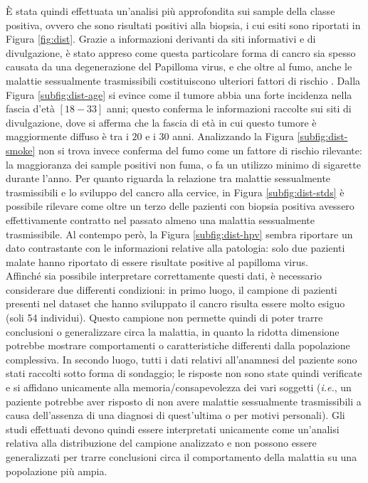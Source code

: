 È stata quindi effettuata un'analisi più approfondita sui sample della classe positiva, ovvero che sono risultati positivi alla biopsia, i cui esiti sono riportati in Figura \ref{fig:dist}.
Grazie a informazioni derivanti da siti informativi e di divulgazione, è stato appreso come questa particolare forma di cancro sia spesso causata da una degenerazione del Papilloma virus, e che oltre al fumo, anche le malattie sessualmente trasmissibili costituiscono ulteriori fattori di rischio \cite{veronesi}.
Dalla Figura \ref{subfig:dist-age} si evince come il tumore abbia una forte incidenza nella fascia d'età $[18-33]$ anni; questo conferma le informazioni raccolte sui siti di divulgazione, dove si afferma che la fascia di età in cui questo tumore è maggiormente diffuso è tra i $20$ e i $30$ anni.
Analizzando la Figura \ref{subfig:dist-smoke} non si trova invece conferma del fumo come un fattore di rischio rilevante: la maggioranza dei sample positivi non fuma, o fa un utilizzo minimo di sigarette durante l'anno.
Per quanto riguarda la relazione tra malattie sessualmente trasmissibili e lo sviluppo del cancro alla cervice, in Figura \ref{subfig:dist-stds} è possibile rilevare come oltre un terzo delle pazienti con biopsia positiva avessero effettivamente contratto nel passato almeno una malattia sessualmente trasmissibile.
Al contempo però, la Figura \ref{subfig:dist-hpv} sembra riportare un dato contrastante con le informazioni relative alla patologia: solo due pazienti malate hanno riportato di essere risultate positive al papilloma virus.\\
Affinché sia possibile interpretare correttamente questi dati, è necessario considerare due differenti condizioni: in primo luogo, il campione di pazienti presenti nel dataset che hanno sviluppato il cancro risulta essere molto esiguo (soli 54 individui).
Questo campione non permette quindi di poter trarre conclusioni o generalizzare circa la malattia, in quanto la ridotta dimensione potrebbe mostrare comportamenti o caratteristiche differenti dalla popolazione complessiva.
In secondo luogo, tutti i dati relativi all'anamnesi del paziente sono stati raccolti sotto forma di sondaggio; le risposte non sono state quindi verificate e si affidano unicamente alla memoria/consapevolezza dei vari soggetti (\textit{i.e.}, un paziente potrebbe aver risposto di non avere malattie sessualmente trasmissibili a causa dell'assenza di una diagnosi di quest'ultima o per motivi personali).
Gli studi effettuati devono quindi essere interpretati unicamente come un'analisi relativa alla distribuzione del campione analizzato e non possono essere generalizzati per trarre conclusioni circa il comportamento della malattia su una popolazione più ampia.

